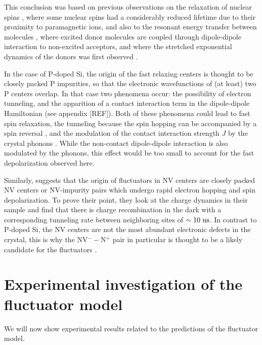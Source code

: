 \documentclass[a4paper,11pt]{report}
\begin{document}
This conclusion was based on previous observations on the relaxation of nuclear spins \citep{bloembergen1949interaction, de1958relaxation, blumberg1960nuclear}, where some nuclear spins had a considerably reduced lifetime due to their proximity to paramagnetic ions, and also to the resonant energy transfer between molecules \citep{forster1949experimentelle, eisenthal1964influence, yokota1967effects}, where excited donor molecules are coupled through dipole-dipole interaction to non-excited acceptors, and where the stretched exponential dynamics of the donors was first observed \citep{forster1949experimentelle}.

In the case of P-doped Si, the origin of the fast relaxing centers is thought to be closely packed P impurities, so that the electronic wavefunctions of (at least) two P centers overlap. In that case two phenomena occur: the possibility of electron tunneling, and the apparition of a contact interaction term in the dipole-dipole Hamiltonian (see appendix [REF]). Both of these phenomena could lead to fast spin relaxation, the tunneling because the spin hopping can be accompanied by a spin reversal \citep{sugihara1963spin}, and the modulation of the contact interaction strength $J$ by the crystal phonons \citep{honig1960electron}. While the non-contact dipole-dipole interaction is also modulated by the phonons, this effect would be too small to account for the fast depolarization observed here.

Similarly, \citep{choi2017depolarization} suggests that the origin of fluctuators in NV centers are closely packed NV centers or NV-impurity pairs which undergo rapid electron hopping and spin depolarization. To prove their point, they look at the charge dynamics in their sample and find that there is charge recombination in the dark with a corresponding tunneling rate between neighboring sites of $\sim 10\ \rm ns$. In contrast to P-doped Si, the NV centers are not the most abundant electronic defects in the crystal, this is why the NV$^--$N$^+$ pair in particular is thought to be a likely candidate for the fluctuators \citep{manson2018nv}.

\section{Experimental investigation of the fluctuator model}
We will now show experimental results related to the predictions of the fluctuator model.
\end{document}
